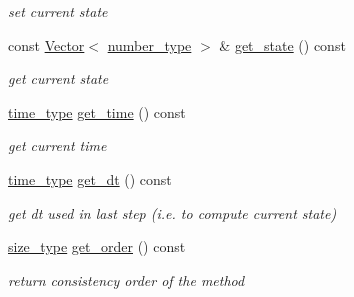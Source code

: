 \begin{DoxyCompactItemize}
\begin{DoxyCompactList}\small\item\em set current state \item\end{DoxyCompactList}\item 
\hypertarget{classhdnum_1_1ModifiedEuler_ab73d18011b660a3e7b7c53caecac96b7}{
const \hyperlink{classhdnum_1_1Vector}{Vector}$<$ \hyperlink{classhdnum_1_1ModifiedEuler_abcfd3cb8a5b446f721582af3b170476e}{number\_\-type} $>$ \& \hyperlink{classhdnum_1_1ModifiedEuler_ab73d18011b660a3e7b7c53caecac96b7}{get\_\-state} () const }
\label{classhdnum_1_1ModifiedEuler_ab73d18011b660a3e7b7c53caecac96b7}

\begin{DoxyCompactList}\small\item\em get current state \item\end{DoxyCompactList}\item 
\hypertarget{classhdnum_1_1ModifiedEuler_a837697657a3543e87c4b3e15ceda8491}{
\hyperlink{classhdnum_1_1ModifiedEuler_a1c273cddcddf36f6e47f713080c06b41}{time\_\-type} \hyperlink{classhdnum_1_1ModifiedEuler_a837697657a3543e87c4b3e15ceda8491}{get\_\-time} () const }
\label{classhdnum_1_1ModifiedEuler_a837697657a3543e87c4b3e15ceda8491}

\begin{DoxyCompactList}\small\item\em get current time \item\end{DoxyCompactList}\item 
\hypertarget{classhdnum_1_1ModifiedEuler_a697a2e3423e5ba2a9bd41b61e1358da5}{
\hyperlink{classhdnum_1_1ModifiedEuler_a1c273cddcddf36f6e47f713080c06b41}{time\_\-type} \hyperlink{classhdnum_1_1ModifiedEuler_a697a2e3423e5ba2a9bd41b61e1358da5}{get\_\-dt} () const }
\label{classhdnum_1_1ModifiedEuler_a697a2e3423e5ba2a9bd41b61e1358da5}

\begin{DoxyCompactList}\small\item\em get dt used in last step (i.e. to compute current state) \item\end{DoxyCompactList}\item 
\hypertarget{classhdnum_1_1ModifiedEuler_abaf92ae2a3a462996b5208d326cc9a6b}{
\hyperlink{classhdnum_1_1ModifiedEuler_aa8841e11397920c273afab1f9a04c9bd}{size\_\-type} \hyperlink{classhdnum_1_1ModifiedEuler_abaf92ae2a3a462996b5208d326cc9a6b}{get\_\-order} () const }
\label{classhdnum_1_1ModifiedEuler_abaf92ae2a3a462996b5208d326cc9a6b}

\begin{DoxyCompactList}\small\item\em return consistency order of the method \item\end{DoxyCompactList}\end{DoxyCompactItemize}


